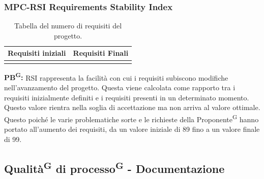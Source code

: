 \documentclass[8pt]{article}
\newcommand{\glossterm}[1]{#1\textsuperscript{G}} %
\begin{document}
\subsubsection{MPC-RSI Requirements Stability Index}
\renewcommand{\arraystretch}{2.5}
\begin{longtable}{|>{\centering}p{3cm}|>{\centering\arraybackslash}p{3cm}|}
    \hline
    \rowcolor{white}
    \textbf{Requisiti iniziali} & \textbf{Requisiti Finali} \\
    \hline
    \endfirsthead 
    \rowcolor{white}
    \caption{Tabella del numero di requisiti del progetto.} 
    \label{table:Tabella del numero di requisiti del progetto}
    \endlastfoot 
    89 & 99 \\
    \hline
\end{longtable}
\textbf{\glossterm{PB}:} RSI rappresenta la facilità con cui i requisiti subiscono modifiche nell'avanzamento del progetto. Questa viene calcolata come rapporto tra i requisiti inizialmente definiti e i requisiti presenti in un determinato momento. Questo valore rientra nella soglia di accettazione ma non arriva al valore ottimale. Questo poiché le varie problematiche sorte e le richieste della \glossterm{Proponente} hanno portato all'aumento dei requisiti, da un valore iniziale di 89 fino a un valore finale di 99.
\clearpage
\subsection{\glossterm{Qualità} di \glossterm{processo} - Documentazione}
\end{document}
